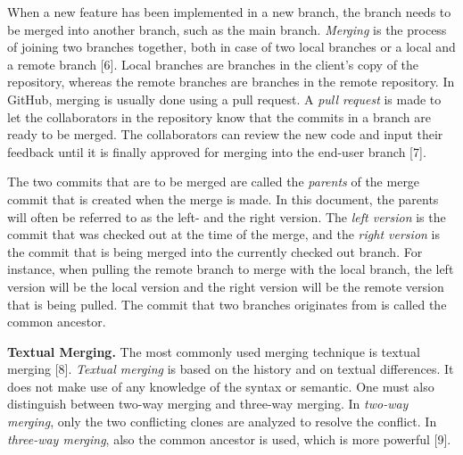 When a new feature has been implemented in a new branch, the branch needs to be merged into another branch, such as the main branch. \textit{Merging} is the process of joining two branches together, both in case of two local branches or a local and a remote branch [6]. Local branches are branches in the client’s copy of the repository, whereas the remote branches are branches in the remote repository. In GitHub, merging is usually done using a pull request. A \textit{pull request} is made to let the collaborators in the repository know that the commits in a branch are ready to be merged. The collaborators can review the new code and input their feedback until it is finally approved for merging into the end-user branch [7].

The two commits that are to be merged are called the \textit{parents} of the merge commit that is created when the merge is made. In this document, the parents will often be referred to as the left- and the right version. The \textit{left version} is the commit that was checked out at the time of the merge, and the \textit{right version} is the commit that is being merged into the currently checked out branch. For instance, when pulling the remote branch to merge with the local branch, the left version will be the local version and the right version will be the remote version that is being pulled. The commit that two branches originates from is called the common ancestor.

\textbf{Textual Merging.} The most commonly used merging technique is textual merging [8]. \textit{Textual merging} is based on the history and on textual differences. It does not make use of any knowledge of the syntax or semantic. One must also distinguish between two-way merging and three-way merging. In \textit{two-way merging}, only the two conflicting clones are analyzed to resolve the conflict. In \textit{three-way merging}, also the common ancestor is used, which is more powerful [9].

